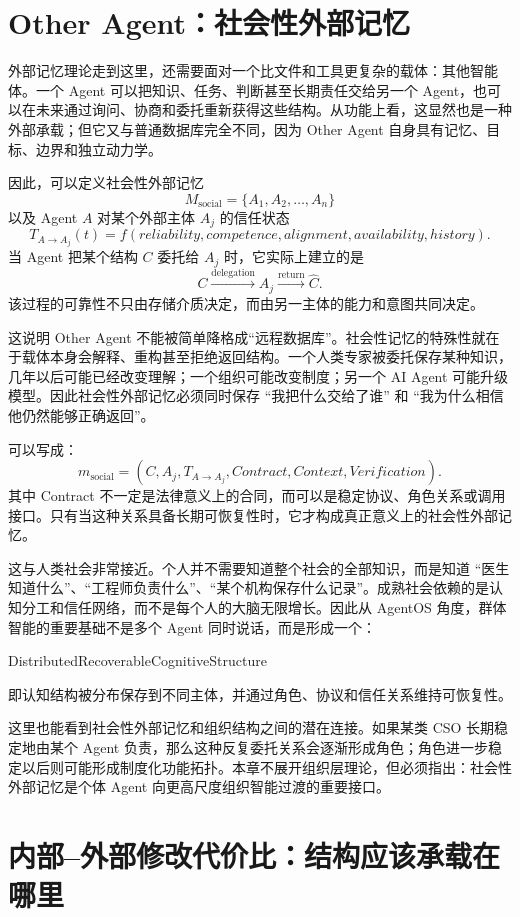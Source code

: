 \section{Other Agent：社会性外部记忆}

外部记忆理论走到这里，还需要面对一个比文件和工具更复杂的载体：其他智能体。一个 Agent 可以把知识、任务、判断甚至长期责任交给另一个 Agent，也可以在未来通过询问、协商和委托重新获得这些结构。从功能上看，这显然也是一种外部承载；但它又与普通数据库完全不同，因为 Other Agent 自身具有记忆、目标、边界和独立动力学。

因此，可以定义社会性外部记忆
\[
M_{\mathrm{social}}
=
\{A_1,A_2,\ldots,A_n\}
\]
以及 Agent \(A\) 对某个外部主体 \(A_j\) 的信任状态
\[
T_{A\rightarrow A_j}(t)
=
f(
reliability,
competence,
alignment,
availability,
history
).
\]
当 Agent 把某个结构 \(C\) 委托给 \(A_j\) 时，它实际上建立的是
\[
C
\xrightarrow{\mathrm{delegation}}
A_j
\xrightarrow{\mathrm{return}}
\widehat C.
\]
该过程的可靠性不只由存储介质决定，而由另一主体的能力和意图共同决定。

这说明 Other Agent 不能被简单降格成``远程数据库''。社会性记忆的特殊性就在于载体本身会解释、重构甚至拒绝返回结构。一个人类专家被委托保存某种知识，几年以后可能已经改变理解；一个组织可能改变制度；另一个 AI Agent 可能升级模型。因此社会性外部记忆必须同时保存 ``我把什么交给了谁'' 和 ``我为什么相信他仍然能够正确返回''。

可以写成：
\[
m_{\mathrm{social}}
=
(C,
A_j,
T_{A\to A_j},
Contract,
Context,
Verification).
\]
其中 Contract 不一定是法律意义上的合同，而可以是稳定协议、角色关系或调用接口。只有当这种关系具备长期可恢复性时，它才构成真正意义上的社会性外部记忆。

这与人类社会非常接近。个人并不需要知道整个社会的全部知识，而是知道 ``医生知道什么''、``工程师负责什么''、``某个机构保存什么记录''。成熟社会依赖的是认知分工和信任网络，而不是每个人的大脑无限增长。因此从 AgentOS 角度，群体智能的重要基础不是多个 Agent 同时说话，而是形成一个：
\begin{statementbox}
DistributedRecoverableCognitiveStructure
\end{statementbox}
即认知结构被分布保存到不同主体，并通过角色、协议和信任关系维持可恢复性。

这里也能看到社会性外部记忆和组织结构之间的潜在连接。如果某类 CSO 长期稳定地由某个 Agent 负责，那么这种反复委托关系会逐渐形成角色；角色进一步稳定以后则可能形成制度化功能拓扑。本章不展开组织层理论，但必须指出：社会性外部记忆是个体 Agent 向更高尺度组织智能过渡的重要接口。

\section{内部--外部修改代价比：结构应该承载在哪里}

